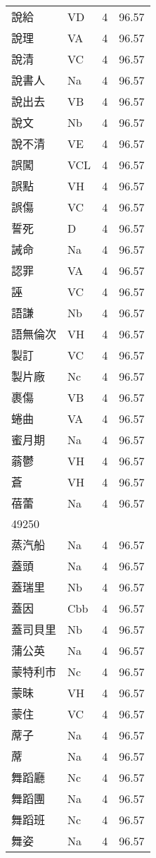 \documentclass[twocolumn]{book}
\begin{document}
\begin{supertabular}{llrr}
說給 & VD & 4 &  96.57\\
說理 & VA & 4 &  96.57\\
說清 & VC & 4 &  96.57\\
說書人 & Na & 4 &  96.57\\
說出去 & VB & 4 &  96.57\\
說文 & Nb & 4 &  96.57\\
說不清 & VE & 4 &  96.57\\
誤闖 & VCL & 4 &  96.57\\
誤點 & VH & 4 &  96.57\\
誤傷 & VC & 4 &  96.57\\
誓死 & D & 4 &  96.57\\
誡命 & Na & 4 &  96.57\\
認罪 & VA & 4 &  96.57\\
誣 & VC & 4 &  96.57\\
語謙 & Nb & 4 &  96.57\\
語無倫次 & VH & 4 &  96.57\\
製訂 & VC & 4 &  96.57\\
製片廠 & Nc & 4 &  96.57\\
裹傷 & VB & 4 &  96.57\\
蜷曲 & VA & 4 &  96.57\\
蜜月期 & Na & 4 &  96.57\\
蓊鬱 & VH & 4 &  96.57\\
蒼 & VH & 4 &  96.57\\
蓓蕾 & Na & 4 &  96.57\\
49250\\
蒸汽船 & Na & 4 &  96.57\\
蓋頭 & Na & 4 &  96.57\\
蓋瑞里 & Nb & 4 &  96.57\\
蓋因 & Cbb & 4 &  96.57\\
蓋司貝里 & Nb & 4 &  96.57\\
蒲公英 & Na & 4 &  96.57\\
蒙特利市 & Nc & 4 &  96.57\\
蒙昧 & VH & 4 &  96.57\\
蒙住 & VC & 4 &  96.57\\
蓆子 & Na & 4 &  96.57\\
蓆 & Na & 4 &  96.57\\
舞蹈廳 & Nc & 4 &  96.57\\
舞蹈團 & Na & 4 &  96.57\\
舞蹈班 & Nc & 4 &  96.57\\
舞姿 & Na & 4 &  96.57\\

\end{supertabular}
\end{document}
